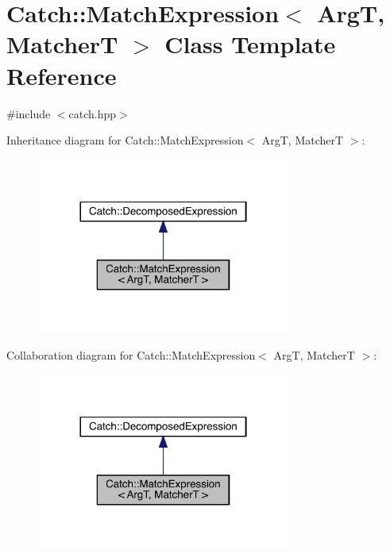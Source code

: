 \hypertarget{class_catch_1_1_match_expression}{}\section{Catch\+:\+:Match\+Expression$<$ ArgT, MatcherT $>$ Class Template Reference}
\label{class_catch_1_1_match_expression}


{\ttfamily \#include $<$catch.\+hpp$>$}



Inheritance diagram for Catch\+:\+:Match\+Expression$<$ ArgT, MatcherT $>$\+:
\nopagebreak
\begin{figure}[H]
\begin{center}
\leavevmode
\includegraphics[width=236pt]{class_catch_1_1_match_expression__inherit__graph}
\end{center}
\end{figure}


Collaboration diagram for Catch\+:\+:Match\+Expression$<$ ArgT, MatcherT $>$\+:
\nopagebreak
\begin{figure}[H]
\begin{center}
\leavevmode
\includegraphics[width=236pt]{class_catch_1_1_match_expression__coll__graph}
\end{center}
\end{figure}
